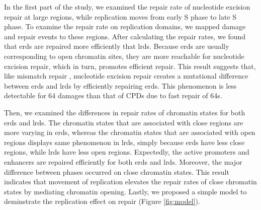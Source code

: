 In the first part of the study, we examined the repair rate of nucleotide excision repair at large regions, while replication moves from early S phase to late S phase. To examine the repair rate on replication domains, we mapped damage and repair events to these regions. After calculating the repair rates, we found that \gls{erd}s are repaired more efficiently that \gls{lrd}s. Because \gls{erd}s are usually corresponding to open chromatin sites, they are more reachable for nucleotide excision repair, which in turn, promotes efficient repair. This result suggests that, like mismatch repair \citep{supek2015differential}, nucleotide excision repair creates a mutational difference between \gls{erd}s and \gls{lrd}s by efficiently repairing \gls{erd}s. This phenomenon is less detectable for \gls{64} damages than that of \gls{CPD}s due to fast repair of \gls{64}s.

Then, we examined the differences in repair rates of chromatin states for both \gls{erd}s and \gls{lrd}s. The chromatin states that are associated with close regions are more varying in \gls{erd}s, whereas the chromatin states that are associated with open regions displays same phenomenon in \gls{lrd}s, simply because \gls{erd}s have less close regions, while \gls{lrd}s have less open regions. Expectedly, the active promoters and enhancers are repaired efficiently for both \gls{erd}s and \gls{lrd}s. Moreover, the major difference between phases occurred on close chromatin states. This result indicates that movement of replication elevates the repair rates of close chromatin states by mediating chromatin opening. Lastly, we proposed a simple model to deminstrate the replication effect on repair (Figure \ref{fig:model}).     


